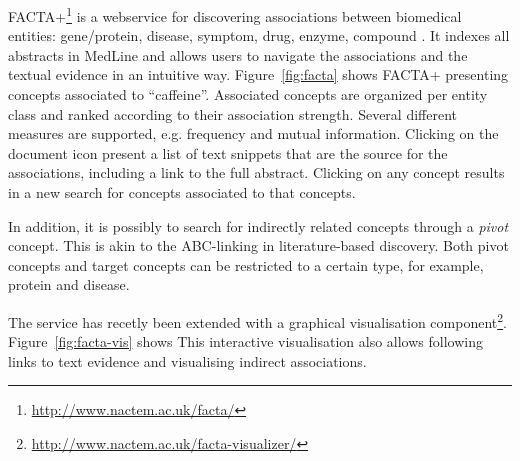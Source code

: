 FACTA+\footnote{\url{http://www.nactem.ac.uk/facta/}} is a webservice for discovering associations between biomedical entities: gene/protein, disease, symptom, drug, enzyme, compound \citep{Tsuruoka2008FACTA}.
It indexes all abstracts in MedLine and allows users to navigate the associations and the textual evidence in an intuitive way.
Figure~\ref{fig:facta} shows FACTA+ presenting concepts associated to ``caffeine''.
Associated concepts are organized per entity class and ranked according to their association strength.
Several different measures are supported, e.g. frequency and mutual information.
Clicking on the document icon present a list of text snippets that are the source for the associations, including a link to the full abstract.
Clicking on any concept results in a new search for concepts associated to that concepts. 

In addition, it is possibly to search for indirectly related concepts through a \emph{pivot} concept.
This is akin to the ABC-linking in literature-based discovery.
Both pivot concepts and target concepts can be restricted to a certain type, for example, protein and disease.

The service has recetly been extended with a graphical visualisation component\footnote{\url{http://www.nactem.ac.uk/facta-visualizer/}}.
Figure~\ref{fig:facta-vis} shows 
This interactive visualisation also allows following links to text evidence and visualising indirect associations.

